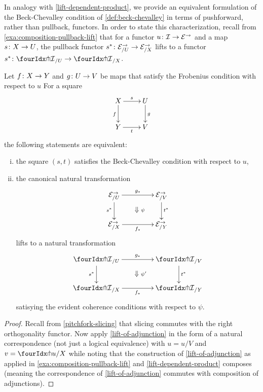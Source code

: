 \documentclass[reqno,10pt,a4paper,oneside,draft]{amsart}
\begin{document}
In analogy with \cref{lift-dependent-product}, we provide an equivalent formulation of the Beck-Chevalley condition of \cref{def:beck-chevalley} in terms of pushforward, rather than pullback, functors.
In order to state this characterization, recall from \cref{exa:composition-pullback-lift} that for a functor $u \colon \mathcal{I} \to \mathcal{E}^\to$ and a map $s \colon X \to U$, the pullback functor $s^* \colon \mathcal{E}^\to_{/U} \to \mathcal{E}^\to_{/X}$ lifts to a functor $s^* \co {\liftr{\cal{I}}}_{/U} \to {\liftr{\cal{I}}}_{/X}$.

\begin{proposition} \label{lift-pushforward-BC}
Let $f \colon X \to Y$ and $g \colon U \to V$ be maps that satisfy the Frobenius condition with respect to $u$
For a square
\[
\xymatrix{
  X
  \ar[d]_{f}
  \ar[r]^{s}
&
  U
  \ar[d]^{g}
\\
  Y
  \ar[r]_{t}
&
  V
}
\]
the following statements are equivalent:
\begin{enumerate}[(i)]
\item the square $(s,t)$ satisfies the Beck-Chevalley condition with respect to $u$,
\item the canonical natural transformation
\[
\xymatrix@C+2em{
  \catE^\to_{/U}
  \ar[r]^{g_*}
   \ar[d]_{s^*}
  \ar@{}[dr]|{\textstyle\Downarrow \rlap{$\labelstyle\psi$}}
&
\catE^\to_{/V}
 \ar[d]^{t^*}
\\
  \catE^\to_{/X}
  \ar[r]_{f_*}
&
  \catE^\to_{/Y}
}
\]
lifts to a natural transformation
\[
\xymatrix@C+2em{
  {\liftr{\cal{I}}}_{/U}
  \ar[r]^{g_*}
  \ar[d]_{s^*}
  \ar@{}[dr]|{\textstyle\Downarrow \rlap{$\labelstyle\psi'$}}
&
  {\liftr{\cal{I}}}_{/V}
  \ar[d]^{t^*}
\\
  {\liftr{\cal{I}}}_{/X}
  \ar[r]_{f_*}
&
  {\liftr{\cal{I}}}_{/Y}
}
\]
satisying the evident coherence conditions with respect to $\psi$.
\end{enumerate}
\end{proposition}

\begin{proof}
Recall from \cref{pitchfork-slicing} that slicing commutes with the right orthogonality functor.
Now apply \cref{lift-of-adjunction} in the form of a natural correspondence (not just a logical equivalence) with $u = u/V$ and $v = \liftr{u}/X$ while noting that the construction of \cref{lift-of-adjunction} as applied in \cref{exa:composition-pullback-lift} and \cref{lift-dependent-product} composes (meaning the correspondence of \cref{lift-of-adjunction} commutes with composition of adjunctions).
\end{proof}
\end{document}
